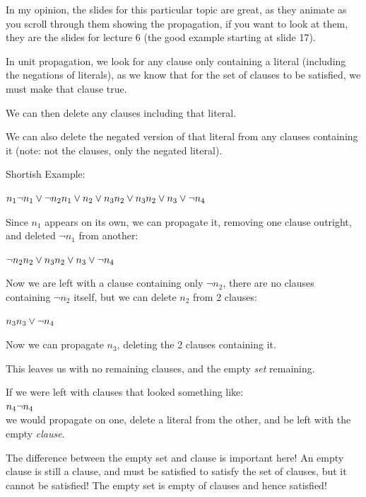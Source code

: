 \documentclass[11pt,a4paper]{article}
\begin{document}
In my opinion, the slides for this particular topic are great, as they animate as you scroll through them showing the propagation, if you want to look at them, they are the slides for lecture 6 (the good example starting at slide 17).

In unit propagation, we look for any clause only containing a literal (including the negations of literals), as we know that for the set of clauses to be satisfied, we must make that clause true.

We can then delete any clauses including that literal.

We can also delete the negated version of that literal from any clauses containing it (note: not the clauses, only the negated literal).

Shortish Example:

$n_1 \\ \neg n_1 \vee \neg n_2 \\ n_1 \vee n_2 \vee n_3 \\ n_2 \vee n_3 \\ n_2 \vee n_3 \vee \neg n_4 $

Since $n_1$ appears on its own, we can propagate it, removing one clause outright, and deleted $\neg n_1$ from another:

$\neg n_2 \\n_2 \vee n_3 \\ n_2 \vee n_3 \vee \neg n_4 $

Now we are left with a clause containing only $\neg n_2$, there are no clauses containing $\neg n_2$ itself, but we can delete $n_2$ from 2 clauses:

$n_3 \\ n_3 \vee \neg n_4 $

Now we can propagate $n_3$, deleting the 2 clauses containing it.

This leaves us with no remaining clauses, and the empty \emph{set} remaining.

If we were left with clauses that looked something like: \\$n_4 \\ \neg n_4$\\ we would propagate on one, delete a literal from the other, and be left with the empty \emph{clause}.

The difference between the empty set and clause is important here! An empty clause is still a clause, and must be satisfied to satisfy the set of clauses, but it cannot be satisfied! The empty set is empty of clauses and hence satisfied!
\end{document}
